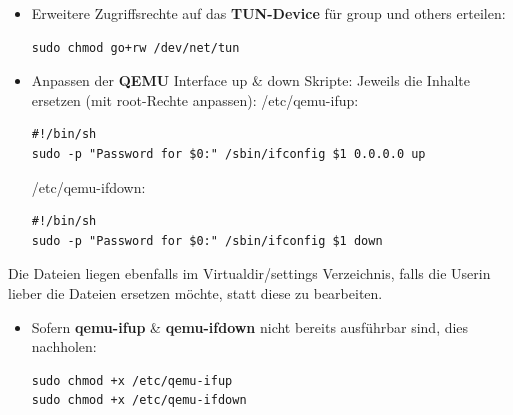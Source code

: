 \documentclass[a4,12pt]{scrartcl}
\begin{document}
\begin{itemize}
\item Erweitere Zugriffsrechte auf das \textbf{TUN-Device} für group und others erteilen:
\begin{lstlisting}
sudo chmod go+rw /dev/net/tun
\end{lstlisting}
\end{itemize}

\begin{itemize}
\item Anpassen der \textbf{QEMU} Interface up \& down Skripte:
\newline
Jeweils die Inhalte ersetzen (mit root-Rechte anpassen):
\newline
/etc/qemu-ifup:
\begin{lstlisting}
#!/bin/sh                                                        
sudo -p "Password for $0:" /sbin/ifconfig $1 0.0.0.0 up
\end{lstlisting}
/etc/qemu-ifdown:
\begin{lstlisting}
#!/bin/sh                                                        
sudo -p "Password for $0:" /sbin/ifconfig $1 down
\end{lstlisting}
\end{itemize}
Die Dateien liegen ebenfalls im Virtualdir/settings Verzeichnis, falls die Userin lieber die Dateien ersetzen möchte, statt diese zu bearbeiten. 

\begin{itemize}
\item Sofern \textbf{qemu-ifup} \& \textbf{qemu-ifdown} nicht bereits ausführbar sind, dies nachholen:
\begin{lstlisting}
sudo chmod +x /etc/qemu-ifup
sudo chmod +x /etc/qemu-ifdown
\end{lstlisting}
\end{itemize}
\end{document}
